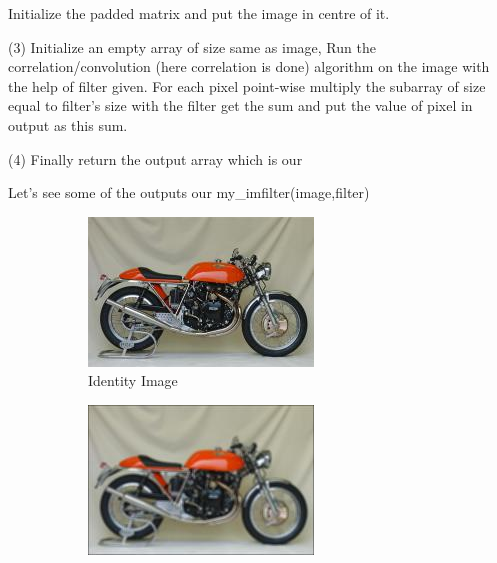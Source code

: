 \documentclass{bmvc2k}
\begin{document}
 Initialize the padded matrix and put the image in centre of it. 

(3) Initialize an empty array of size same as image, Run the correlation/convolution (here correlation is done) algorithm on the image with the help of filter given. For each pixel point-wise multiply the subarray of size equal to filter's size with the filter get the sum and put the value of pixel in output as this sum. 

(4) Finally return the output array which is our 

Let's see some of the outputs our my\_imfilter(image,filter)

\begin{figure}[h!]
  \centering
  \begin{subfigure}[b]{0.3\linewidth}
    \includegraphics[width=\linewidth]{images/identity_image.jpg}
    \caption{Identity Image}
  \end{subfigure}
  \begin{subfigure}[b]{0.3\linewidth}
    \includegraphics[width=\linewidth]{images/blur_image.jpg}

\end{subfigure}
\end{figure}
\end{document}
